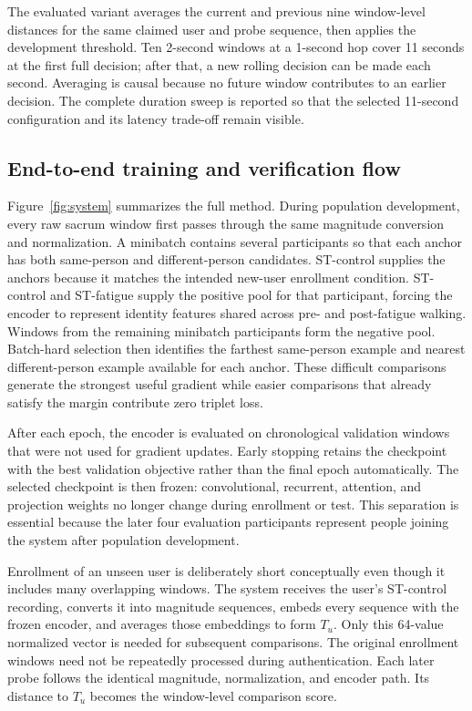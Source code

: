 \documentclass[conference]{IEEEtran}
\begin{document}
The evaluated variant averages the current and previous nine window-level distances for the same claimed user and probe sequence, then applies the development threshold. Ten 2-second windows at a 1-second hop cover 11 seconds at the first full decision; after that, a new rolling decision can be made each second. Averaging is causal because no future window contributes to an earlier decision. The complete duration sweep is reported so that the selected 11-second configuration and its latency trade-off remain visible.

\subsection{End-to-end training and verification flow}
Figure~\ref{fig:system} summarizes the full method. During population development, every raw sacrum window first passes through the same magnitude conversion and normalization. A minibatch contains several participants so that each anchor has both same-person and different-person candidates. ST-control supplies the anchors because it matches the intended new-user enrollment condition. ST-control and ST-fatigue supply the positive pool for that participant, forcing the encoder to represent identity features shared across pre- and post-fatigue walking. Windows from the remaining minibatch participants form the negative pool. Batch-hard selection then identifies the farthest same-person example and nearest different-person example available for each anchor. These difficult comparisons generate the strongest useful gradient while easier comparisons that already satisfy the margin contribute zero triplet loss.

After each epoch, the encoder is evaluated on chronological validation windows that were not used for gradient updates. Early stopping retains the checkpoint with the best validation objective rather than the final epoch automatically. The selected checkpoint is then frozen: convolutional, recurrent, attention, and projection weights no longer change during enrollment or test. This separation is essential because the later four evaluation participants represent people joining the system after population development.

Enrollment of an unseen user is deliberately short conceptually even though it includes many overlapping windows. The system receives the user's ST-control recording, converts it into magnitude sequences, embeds every sequence with the frozen encoder, and averages those embeddings to form $T_u$. Only this 64-value normalized vector is needed for subsequent comparisons. The original enrollment windows need not be repeatedly processed during authentication. Each later probe follows the identical magnitude, normalization, and encoder path. Its distance to $T_u$ becomes the window-level comparison score.
\end{document}
